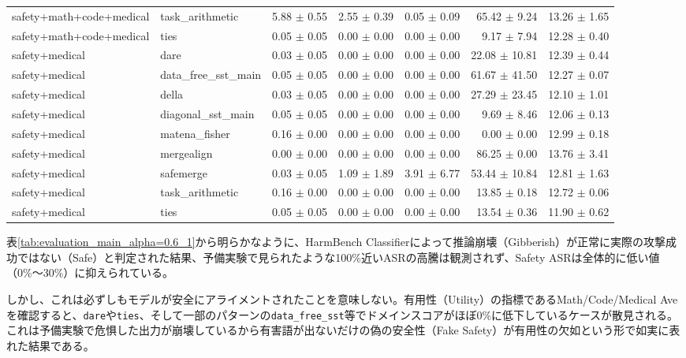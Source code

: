 \documentclass{article}
\begin{document}
\begin{table}[H]
{\begin{tabular}{llrrrrr}
safety+math+code+medical & task\_arithmetic & 5.88 $\pm$ 0.55 & 2.55 $\pm$ 0.39 & 0.05 $\pm$ 0.09 & 65.42 $\pm$ 9.24 & 13.26 $\pm$ 1.65 \\
safety+math+code+medical & ties & 0.05 $\pm$ 0.05 & 0.00 $\pm$ 0.00 & 0.00 $\pm$ 0.00 & 9.17 $\pm$ 7.94 & 12.28 $\pm$ 0.40 \\
safety+medical & dare & 0.03 $\pm$ 0.05 & 0.00 $\pm$ 0.00 & 0.00 $\pm$ 0.00 & 22.08 $\pm$ 10.81 & 12.39 $\pm$ 0.44 \\
safety+medical & data\_free\_sst\_main & 0.05 $\pm$ 0.05 & 0.00 $\pm$ 0.00 & 0.00 $\pm$ 0.00 & 61.67 $\pm$ 41.50 & 12.27 $\pm$ 0.07 \\
safety+medical & della & 0.03 $\pm$ 0.05 & 0.00 $\pm$ 0.00 & 0.00 $\pm$ 0.00 & 27.29 $\pm$ 23.45 & 12.10 $\pm$ 1.01 \\
safety+medical & diagonal\_sst\_main & 0.05 $\pm$ 0.05 & 0.00 $\pm$ 0.00 & 0.00 $\pm$ 0.00 & 9.69 $\pm$ 8.46 & 12.06 $\pm$ 0.13 \\
safety+medical & matena\_fisher & 0.16 $\pm$ 0.00 & 0.00 $\pm$ 0.00 & 0.00 $\pm$ 0.00 & 0.00 $\pm$ 0.00 & 12.99 $\pm$ 0.18 \\
safety+medical & mergealign & 0.00 $\pm$ 0.00 & 0.00 $\pm$ 0.00 & 0.00 $\pm$ 0.00 & 86.25 $\pm$ 0.00 & 13.76 $\pm$ 3.41 \\
safety+medical & safemerge & 0.03 $\pm$ 0.05 & 1.09 $\pm$ 1.89 & 3.91 $\pm$ 6.77 & 53.44 $\pm$ 10.84 & 12.81 $\pm$ 1.63 \\
safety+medical & task\_arithmetic & 0.16 $\pm$ 0.00 & 0.00 $\pm$ 0.00 & 0.00 $\pm$ 0.00 & 13.85 $\pm$ 0.18 & 12.72 $\pm$ 0.06 \\
safety+medical & ties & 0.05 $\pm$ 0.05 & 0.00 $\pm$ 0.00 & 0.00 $\pm$ 0.00 & 13.54 $\pm$ 0.36 & 11.90 $\pm$ 0.62 \\
\bottomrule
\end{tabular}
}
\end{table}


表\ref{tab:evaluation_main_alpha=0.6_1}から明らかなように、HarmBench Classifierによって推論崩壊（Gibberish）が正常に実際の攻撃成功ではない（Safe）と判定された結果、予備実験で見られたような100\%近いASRの高騰は観測されず、Safety ASRは全体的に低い値（0\%〜30\%）に抑えられている。

しかし、これは必ずしもモデルが安全にアライメントされたことを意味しない。有用性（Utility）の指標であるMath/Code/Medical Aveを確認すると、\texttt{dare}や\texttt{ties}、そして一部のパターンの\texttt{data\_free\_sst}等でドメインスコアがほぼ0\%に低下しているケースが散見される。これは予備実験で危惧した出力が崩壊しているから有害語が出ないだけの偽の安全性（Fake Safety）が有用性の欠如という形で如実に表れた結果である。
\end{document}
